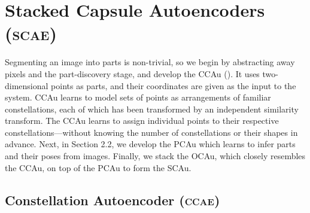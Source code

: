 \section{Stacked Capsule Autoencoders (\textsc{scae})}
\label{sec:caps_decoders}

Segmenting an image into parts is non-trivial, so we begin by abstracting away pixels and the part-discovery stage, and develop the \gls{CCAu} ().
It uses two-dimensional points as parts, and their coordinates are given as the input to the system. \Gls{CCAu} learns to model sets of points as arrangements of familiar constellations, each of which has been transformed by an independent similarity transform. The \gls{CCAu} learns to assign individual points to their respective constellations—without knowing the number of constellations or their shapes in advance.  Next, in Section 2.2, we develop the \gls{PCAu} which learns to infer parts and their poses from images. Finally, we stack the \gls{OCAu}, which closely resembles the \gls{CCAu}, on top of the \gls{PCAu} to form the \gls{SCAu}.



\subsection{Constellation Autoencoder (\textsc{ccae})}
\label{sec:constellation}


